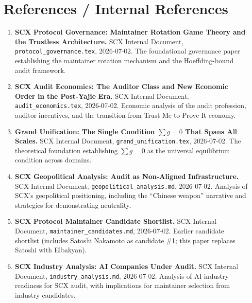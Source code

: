 \documentclass[12pt,a4paper]{article}
\theoremstyle{remark}
\begin{document}
\section{References / Internal References}

\begin{enumerate}[leftmargin=*]
    \item \textbf{SCX Protocol Governance: Maintainer Rotation Game Theory
          and the Trustless Architecture.} SCX Internal Document,
          \texttt{protocol\_governance.tex}, 2026-07-02.
          The foundational governance paper establishing the maintainer
          rotation mechanism and the Hoeffding-bound audit framework.

    \item \textbf{SCX Audit Economics: The Auditor Class and New Economic
          Order in the Post-Yajie Era.} SCX Internal Document,
          \texttt{audit\_economics.tex}, 2026-07-02.
          Economic analysis of the audit profession, auditor incentives,
          and the transition from Trust-Me to Prove-It economy.

    \item \textbf{Grand Unification: The Single Condition $\sum g = 0$
          That Spans All Scales.} SCX Internal Document,
          \texttt{grand\_unification.tex}, 2026-07-02.
          The theoretical foundation establishing $\sum g = 0$ as the
          universal equilibrium condition across domains.

    \item \textbf{SCX Geopolitical Analysis: Audit as Non-Aligned
          Infrastructure.} SCX Internal Document,
          \texttt{geopolitical\_analysis.md}, 2026-07-02.
          Analysis of SCX's geopolitical positioning, including the
          ``Chinese weapon'' narrative and strategies for demonstrating
          neutrality.

    \item \textbf{SCX Protocol Maintainer Candidate Shortlist.} SCX Internal
          Document, \texttt{maintainer\_candidates.md}, 2026-07-02.
          Earlier candidate shortlist (includes Satoshi Nakamoto as
          candidate \#1; this paper replaces Satoshi with Elbakyan).

    \item \textbf{SCX Industry Analysis: AI Companies Under Audit.}
          SCX Internal Document, \texttt{industry\_analysis.md}, 2026-07-02.
          Analysis of AI industry readiness for SCX audit, with
          implications for maintainer selection from industry candidates.


\end{enumerate}
\end{document}

